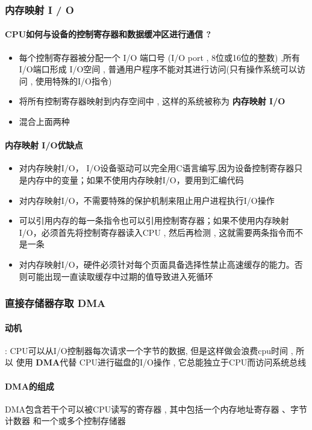 \documentclass[UTF8,a4paper]{ctexart}
\begin{document}
\subsubsection{内存映射 I / O}
\paragraph{CPU如何与设备的控制寄存器和数据缓冲区进行通信 ? }
\begin{itemize}
	\item 每个控制寄存器被分配一个 I/O 端口号 (I/O port , 8位或16位的整数) ,所有I/O端口形成 I/O空间 , 普通用户程序不能对其进行访问(只有操作系统可以访问 , 使用特殊的I/O指令)
	\item 将所有控制寄存器映射到内存空间中 , 这样的系统被称为 \textbf{内存映射 I/O}
	\item 混合上面两种
\end{itemize}

\paragraph{内存映射 I/O优缺点}
\begin{itemize}
	\item 对内存映射I/O， I/O设备驱动可以完全用C语言编写,因为设备控制寄存器只是内存中的变量；如果不使用内存映射I/O，要用到汇编代码
	\item 对内存映射I/O，不需要特殊的保护机制来阻止用户进程执行I/O操作
	\item 可以引用内存的每一条指令也可以引用控制寄存器；如果不使用内存映射I/O，必须首先将控制寄存器读入CPU  , 然后再检测 , 这就需要两条指令而不是一条
	\item 对内存映射I/O，硬件必须针对每个页面具备选择性禁止高速缓存的能力。否则可能出现一直读取缓存中过期的值导致进入死循环
\end{itemize}

\subsubsection{直接存储器存取 DMA}
\paragraph{动机} : CPU可以从I/O控制器每次请求一个字节的数据, 但是这样做会浪费cpu时间 , 所以 使用 \textbf{DMA}代替 CPU进行磁盘的I/O操作 , 它总能独立于CPU而访问系统总线

\paragraph{DMA的组成} DMA包含若干个可以被CPU读写的寄存器 , 其中包括一个内存地址寄存器 、字节计数器 和一个或多个控制存储器 
\end{document}
